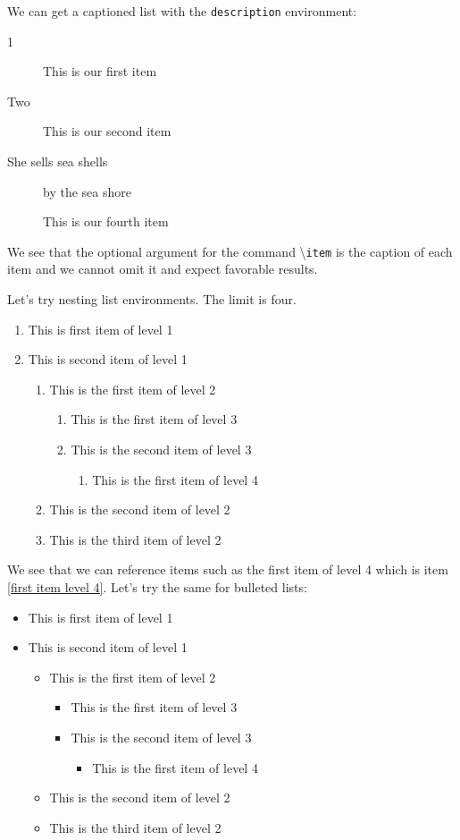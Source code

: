 \documentclass[12pt]{amsart}
\theoremstyle{plain}
\newtheorem{name of environment}{Typeset Proclamation} %
\newtheorem*{no numbering}{No Numbering}
\theoremstyle{definition}
\theoremstyle{remark}
\begin{document}
We can get a captioned list with the \texttt{description} environment:
\begin{description}
\item[1] This is our first item
\item[Two] This is our second item
\item[She sells sea shells] by the sea shore
\item[] This is our fourth item
\end{description}
We see that the optional argument for the command \textbackslash \texttt{item} is the caption of each item and we cannot omit it and expect favorable results.
\vspace{12pt}

Let's try nesting list environments. The limit is four.
\begin{enumerate}
\item This is first item of level 1
\item This is  second item of level 1
	\begin{enumerate}
	\item This is the first item of level 2
		\begin{enumerate}
		\item This is the first item of level 3 \label{first item level 3}
		\item This is the second item of level 3
			\begin{enumerate}
			\item This is the first item of level 4 \label{first item level 4}
			\end{enumerate}
		\end{enumerate}
	\item This is the second item of level 2
	\item This is the third item of level 2
	\end{enumerate}
\end{enumerate}
We see that we can reference items such as the first item of level 4 which is item \ref{first item level 4}. 
\newpage
Let's try the same for bulleted lists:
\begin{itemize}
\item This is first item of level 1
\item This is  second item of level 1
	\begin{itemize}
	\item This is the first item of level 2
		\begin{itemize}
		\item This is the first item of level 3
		\item This is the second item of level 3
			\begin{itemize}
			\item This is the first item of level 4
			\end{itemize}
		\end{itemize}
	\item This is the second item of level 2
	\item This is the third item of level 2
	\end{itemize}
\end{itemize}
\vspace{12pt}
\end{document}
